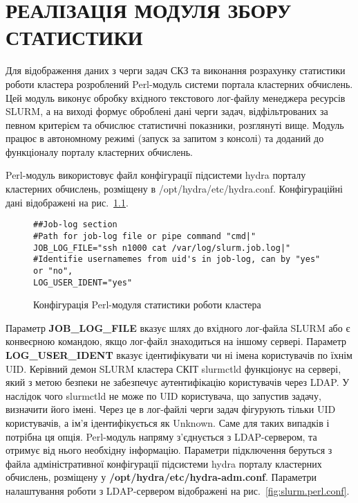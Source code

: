 \chapter{РЕАЛІЗАЦІЯ МОДУЛЯ ЗБОРУ СТАТИСТИКИ}
\label{app-module-for-statistics-gather}

Для відображення даних з черги задач СКЗ та виконання розрахунку статистики роботи кластера розроблений Perl-модуль системи портала кластерних обчислень. Цей модуль  виконує обробку вхідного текстового лог-файлу менеджера ресурсів SLURM, а на виході формує оброблені дані черги задач, відфільтрованих за певном критерієм та обчислює статистичні показники, розглянуті вище. Модуль працює в автономному режимі (запуск за запитом з консолі) та доданий до функціоналу порталу кластерних обчислень.

Perl-модуль використовує файл конфігурації підсистеми hydra порталу кластерних обчислень, розміщену в /opt/hydra/etc/hydra.conf. Конфігураційні дані відображені на рис.~\ref{fig:slurm.perl}.

\begin{figure}[!hb]
\begin{lstlisting}
##Job-log section
#Path for job-log file or pipe command "cmd|"
JOB_LOG_FILE="ssh n1000 cat /var/log/slurm.job.log|"
#Identifie usernamemes from uid's in job-log, can by "yes" or "no",
LOG_USER_IDENT="yes"
\end{lstlisting}
  \caption{Конфігурація Perl-модуля статистики роботи кластера}
 \label{fig:slurm.perl}
\end{figure}

Параметр \textbf{JOB\_LOG\_FILE} вказує шлях до вхідного лог-файла SLURM або є конвеєрною командою, якщо лог-файл знаходиться на іншому сервері. Параметр \textbf{LOG\_USER\_IDENT} вказує ідентифікувати чи ні імена користувачів по їхнім  UID. Керівний демон SLURM кластера СКІТ  slurmctld функціонує на сервері, який з метою безпеки не забезпечує аутентифікацію користувачів через LDAP. У наслідок чого slurmctld не може по UID користувача, що запустив задачу, визначити його імені. Через це в лог-файлі черги задач фігурують тільки UID користувачів, а ім'я ідентифікується як Unknown. Саме для таких випадків і потрібна ця опція. Perl-модуль  напряму з’єднується з LDAP-сервером, та отримує від нього необхідну інформацію. Параметри підключення беруться з файла адміністративної конфігурації підсистеми hydra порталу кластерних обчислень, розміщену у \textbf{/opt/hydra/etc/hydra-adm.conf}. Параметри налаштування роботи з LDAP-сервером відображені на рис.~\ref{fig:slurm.perl.conf}.

